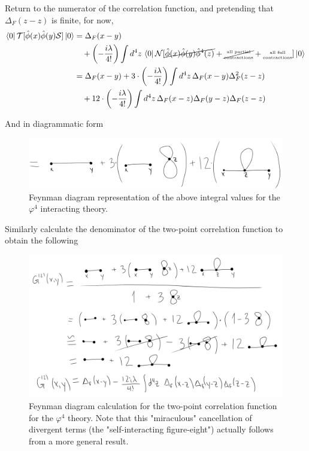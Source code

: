 \noindent Return to the numerator of the correlation function, and pretending that $\Delta_F(z-z)$ is finite, for now,
\begin{align*}
\bra{0} \mathcal{T} [\hat{\phi}(x) \hat{\phi}(y) \mathcal{S}]\ket{0} &= \Delta_F(x-y) \\
&\,\,\,\,\,\, + \left(-\frac{i\lambda}{4!}\right) \int d^4 z \, \bra{0} \mathcal{N} [\cancel{\hat{\phi}(x) \hat{\phi}(y) \hat{\phi}^4(z)} + \cancel{\text{\tiny {\stackanchor{all partial}{contractions}}}} + \text{\tiny {\stackanchor{all full}{contractions}}}] \ket{0} \\
&= \Delta_F(x-y) + 3 \cdot \left(-\frac{i\lambda}{4!}\right)\int d^4 z \, \Delta_F(x-y) \Delta_F^2(z-z) \\
&\,\,\,\,\,\, + 12 \cdot \left(-\frac{i\lambda}{4!}\right)\int d^4 z \, \Delta_F(x-z) \Delta_F(y-z) \Delta_F(z-z)
\end{align*}

\noindent And in diagrammatic form

\begin{figure}[H]
	\centering
	\includegraphics[scale=0.3]{feynman2.png}
	\caption{Feynman diagram representation of the above integral values for the $\varphi^4$ interacting theory.}
\end{figure}

\noindent Similarly calculate the denominator of the two-point correlation function to obtain the following

\begin{figure}[H]
	\centering
	\includegraphics[scale=0.4]{twopoint.png}
	\caption{Feynman diagram calculation for the two-point correlation function for the $\varphi^4$ theory. Note that this "miraculous" cancellation of divergent terms (the "self-interacting figure-eight") actually follows from a more general result.}
\end{figure}

